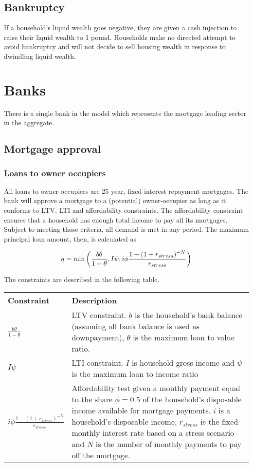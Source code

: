 \documentclass{report}
\begin{document}
\subsection{Bankruptcy}
If a household's liquid wealth goes negative, they are given a cash injection to raise their liquid wealth to 1 pound. Households make no directed attempt to avoid bankruptcy and will not decide to sell housing wealth in response to dwindling liquid wealth.

\section{Banks}

There is a single bank in the model which represents the mortgage lending
sector in the aggregate.

\subsection{Mortgage approval}
\subsubsection{Loans to owner occupiers}
All loans to owner-occupiers are 25 year, fixed interest repayment mortgages. The bank will approve a mortgage to a (potential) owner-occupier as long as it conforms to LTV, LTI and affordability constraints. The affordability constraint ensures that a household has enough total income to pay all its mortgages. Subject to meeting those criteria, all demand is met in any period. The maximum principal loan amount, then, is calculated as

\begin{equation}
q=\min \left( \frac{b\theta}{1-\theta},I \psi ,i\phi\frac{%
1-(1+r_{stress})^{-N}}{r_{stress}}\right)
\end{equation}

The constraints are described in the following table.

\begin{tabular}{p{1in}|p{3.5in}}
Constraint & Description \\ \hline\hline
$\frac{b\theta}{1-\theta}$ & LTV constraint. $b$ is the household's bank
balance (assuming all bank balance is used as downpayment), $\theta$ is the maximum loan to value ratio. \\ 
$I\psi $ & LTI constraint. $I$ is household gross income and $\psi $ is
the maximum loan to income ratio \\ 
$i\phi\frac{1-(1+r_{stress})^{-N}}{r_{stress}}$ & Affordability test
given a monthly payment equal to
the share $\phi=0.5$ of the household's disposable income available for
mortgage payments. $i$ is a household's disposable income, $r_{stress}$ is the fixed monthly interest rate based on
a stress scenario and $N$ is the number of monthly payments to pay off the
mortgage.
\end{tabular}
\end{document}
